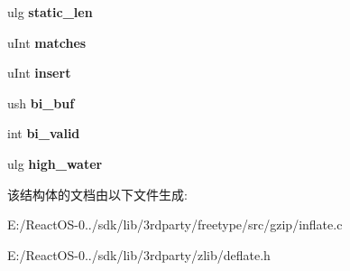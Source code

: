 \begin{DoxyCompactItemize}
\mbox{\label{structinternal__state_a8a83e269866761afa3a7b4641ba5ff91}} 
ulg {\bfseries static\+\_\+len}
\item 
\mbox{\label{structinternal__state_ac0f10ec7237615f6b632f2f4d14872ef}} 
u\+Int {\bfseries matches}
\item 
\mbox{\label{structinternal__state_a315b7281f725e5729fbbafada48fc70a}} 
u\+Int {\bfseries insert}
\item 
\mbox{\label{structinternal__state_a6880946d081053778f5f544b04603d13}} 
ush {\bfseries bi\+\_\+buf}
\item 
\mbox{\label{structinternal__state_a241f3606e41a3aa0ef22868a41bd9a0f}} 
int {\bfseries bi\+\_\+valid}
\item 
\mbox{\label{structinternal__state_a85439cd585435b2590039339139d25cb}} 
ulg {\bfseries high\+\_\+water}
\end{DoxyCompactItemize}


该结构体的文档由以下文件生成\+:\begin{DoxyCompactItemize}
\item 
E\+:/\+React\+O\+S-\/0../sdk/lib/3rdparty/freetype/src/gzip/inflate.\+c\item 
E\+:/\+React\+O\+S-\/0../sdk/lib/3rdparty/zlib/deflate.\+h\end{DoxyCompactItemize}
